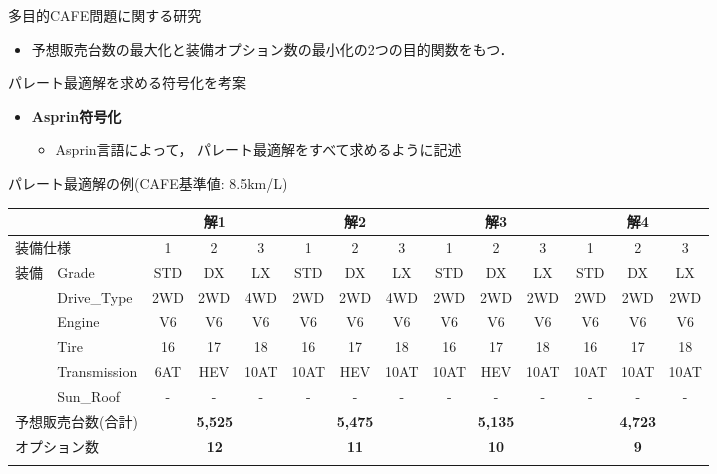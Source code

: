 \documentclass[dvipdfmx, 11pt]{beamer}
\begin{document}
\begin{frame}{多目的CAFE問題に関する研究}
 \begin{itemize}
  \item 予想販売台数の最大化と装備オプション数の最小化の2つの目的関数をもつ．
 \end{itemize}
 \begin{block}{パレート最適解を求める符号化を考案}
   \begin{itemize}
    \item {\bf Asprin符号化}
	  \begin{itemize}
	   \item Asprin言語によって，
		 パレート最適解をすべて求めるように記述
	  \end{itemize}
 \end{itemize}

 \end{block}
 \begin{exampleblock}{パレート最適解の例{\normalsize (CAFE基準値: 8.5km/L)}}
    \centering
  \tiny
  \tabcolsep=1.5mm
  \begin{tabular}{l|l|c|c|c||c|c|c||c|c|c||c|c|c}
   \multicolumn{2}{l|}{} & \multicolumn{3}{c||}{解1} & \multicolumn{3}{c||}{解2} & \multicolumn{3}{c||}{解3} & \multicolumn{3}{c}{解4}\\ \hline
   \multicolumn{2}{l|}{装備仕様} & 1 & 2 & 3 & 1 & 2 & 3 & 1 & 2 & 3 & 1 & 2 & 3 \\ \hline
   装備 & Grade & STD & DX & LX & STD & DX & LX & STD & DX & LX & STD & DX & LX \\
       & Drive\_Type & 2WD & 2WD & \alert{4WD} & 2WD & 2WD & \alert{4WD} & 2WD & 2WD & \alert{2WD} & 2WD & 2WD & \alert{2WD}\\
       & Engine & V6 & V6 & V6 & V6 & V6 & V6 & V6 & V6 & V6 & V6 & V6 & V6 \\
       & Tire & 16 & 17 & 18 & 16 & 17 & 18 & 16 & 17 & 18 & 16 & 17 & 18 \\
       & Transmission & \alert{6AT} & \alert{HEV} & 10AT & \alert{10AT} & \alert{HEV} & 10AT & \alert{10AT} & \alert{HEV} & 10AT & \alert{10AT} & \alert{10AT} & 10AT \\
       & Sun\_Roof & - & - & - & - & - & - & - & - & - & - & - & - \\ \hline
   \multicolumn{2}{l|}{予想販売台数(合計)}  & \multicolumn{3}{c||}{\bf 5,525} & \multicolumn{3}{c||}{\bf 5,475} & \multicolumn{3}{c||}{\bf 5,135} & \multicolumn{3}{c}{\bf 4,723} \\ 
   \multicolumn{2}{l|}{オプション数} & \multicolumn{3}{c||}{\bf 12} & \multicolumn{3}{c||}{\bf 11} & \multicolumn{3}{c||}{\bf 10} & \multicolumn{3}{c}{\bf 9} \\
   \multicolumn{14}{c}{}
  \end{tabular}

 \end{exampleblock}
\end{frame}
\end{document}
